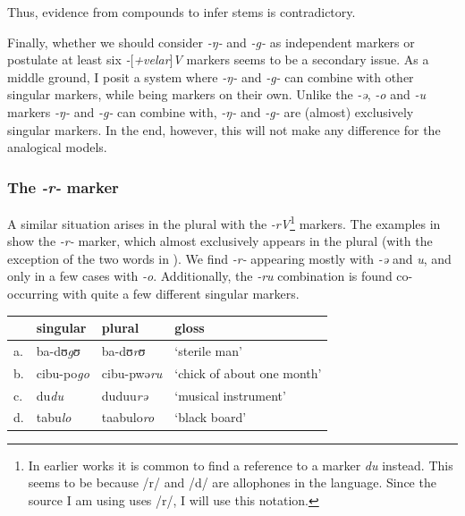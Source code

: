 Thus, evidence from compounds to infer stems is contradictory.

Finally, whether we should consider \textit{-ŋ-} and \textit{-g-} as independent markers or postulate at least six \textit{-}[\textit{+velar}]\textit{V} markers seems to be a secondary issue. As a middle ground, I posit a  system where \textit{-ŋ-} and \textit{-g-} can combine with other singular markers, while being markers on their own. Unlike the \textit{-ə}, \textit{-o} and \textit{-u} markers \textit{-ŋ-} and \textit{-g-} can combine with, \textit{-ŋ-} and \textit{-g-} are (almost) exclusively singular markers. In the end, however, this will not make any difference for the analogical models.

\subsubsection{The \textit{-r-} marker}

A similar situation arises in the plural with the \textit{-rV}\footnote{In earlier works it is common to find a reference to a marker \textit{du} instead. This seems to be because /r/ and /d/ are allophones in the language. Since the source I am using uses /r/, I will use this notation.} markers. The examples in  show the \textit{-r-} marker, which almost exclusively appears in the plural (with the exception of the two words in ). We find \textit{-r-} appearing mostly with \textit{-ə} and \textit{u}, and only in a few cases with \textit{-o}. Additionally, the \textit{-ru} combination is found co-occurring with quite a few different singular markers.

\begin{exe}
    \ex \label{rupl-kasem}
    \begin{tabular}[t]{llll}
      & singular  & plural     & gloss                      \\
      \midrule
      a. & ba-dʊ\textit{gʊ}   & ba-dʊ\textit{rʊ}    & `sterile man'              \\
      b. & cibu-po\textit{go} & cibu-pwə\textit{ru} & `chick of about one month' \\
      c. & du\textit{du}      & duduu\textit{rə}    & `musical instrument'       \\
      d. & tabu\textit{lo}    & taabulo\textit{ro}  & `black board'              \\
    \end{tabular}
\end{exe}

